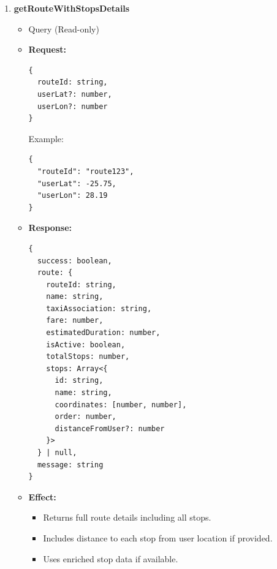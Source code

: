\documentclass[a4paper,12pt]{article}
\begin{document}
\begin{enumerate}
  \item \textbf{getRouteWithStopsDetails}
  \begin{itemize}
    \item Query (Read-only)
    \item \textbf{Request:}
    \begin{verbatim}
{
  routeId: string,
  userLat?: number,
  userLon?: number
}
    \end{verbatim}
    Example:
    \begin{verbatim}
{
  "routeId": "route123",
  "userLat": -25.75,
  "userLon": 28.19
}
    \end{verbatim}
    \item \textbf{Response:}
    \begin{verbatim}
{
  success: boolean,
  route: {
    routeId: string,
    name: string,
    taxiAssociation: string,
    fare: number,
    estimatedDuration: number,
    isActive: boolean,
    totalStops: number,
    stops: Array<{
      id: string,
      name: string,
      coordinates: [number, number],
      order: number,
      distanceFromUser?: number
    }>
  } | null,
  message: string
}
    \end{verbatim}
    \item \textbf{Effect:}
    \begin{itemize}
      \item Returns full route details including all stops.
      \item Includes distance to each stop from user location if provided.
      \item Uses enriched stop data if available.
    \end{itemize}
  \end{itemize}


\end{enumerate}
\end{document}
